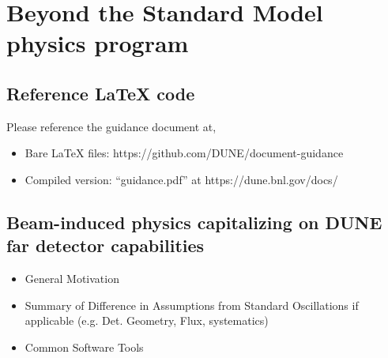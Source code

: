 \chapter{Beyond the Standard Model physics program }
\label{ch:bsm}

\section{Reference LaTeX code}

Please reference the guidance document at, 

\begin{itemize}
\item Bare LaTeX files: https://github.com/DUNE/document-guidance
\item Compiled version: ``guidance.pdf'' at https://dune.bnl.gov/docs/
\end{itemize}


\section{Beam-induced physics capitalizing on DUNE far detector capabilities}\label{sec:bsm-beam}

\begin{itemize}
\item General Motivation
\item Summary of Difference in Assumptions from Standard Oscillations if applicable (e.g. Det. Geometry, Flux, systematics)
\item Common Software Tools
\end{itemize}

